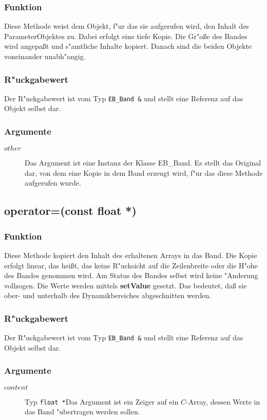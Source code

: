 \documentclass[12pt,a4paper,draft,twoside,onecolumn,titlepage]{book}
\newcommand{\method}[1]{{\bf #1}}
\newcommand{\carg}[1]{$ #1 $}
\newcommand{\ctyp}[1]{{\tt #1}}
\newcommand{\class}[1]{{\sc #1}}
\newcommand{\arglist}[1]{\footnotesize{#1}}
\begin{document}
\subsubsection{Funktion}
Diese Methode weist dem Objekt, f"ur das sie aufgerufen wird, den Inhalt des ParameterObjektes zu. Dabei erfolgt eine tiefe Kopie. Die Gr"o{\ss}e des Bandes wird angepa{\ss}t und s"amtliche Inhalte kopiert. Danach sind die beiden Objekte voneinander unabh"angig.
\subsubsection{R"uckgabewert}
Der R"uckgabewert ist vom Typ \ctyp{EB\_Band \&} und stellt eine Referenz auf das Objekt selbst dar. 
\subsubsection{Argumente}
\begin{description}
\item[\carg{other}]{Das Argument ist eine Instanz der Klasse \class{EB\_Band}. Es stellt das Original dar, von dem eine Kopie in dem Band erzeugt wird, f"ur das diese Methode aufgerufen wurde.}
\end{description}
\subsection{operator=\arglist{(const float *)}}
\subsubsection{Funktion}
Diese Methode kopiert den Inhalt des erhaltenen Arrays in das Band. Die Kopie erfolgt linear, das hei{\ss}t, das keine R"ucksicht auf die Zeilenbreite oder die H"ohe des Bandes genommen wird. Am Status des Bandes selbst wird keine "Anderung vollzogen. Die Werte werden mittels \method{setValue} gesetzt. Das bedeutet, da{\ss} sie ober- und unterhalb des Dynamikbereiches abgeschnitten werden.
\subsubsection{R"uckgabewert}
Der R"uckgabewert ist vom Typ \ctyp{EB\_Band \&} und stellt eine Referenz auf das Objekt selbst dar. 
\subsubsection{Argumente}
\begin{description}
\item[\carg{content}]{Typ \ctyp{float *}Das Argument ist ein Zeiger auf ein $C$-Array, dessen Werte in das Band "ubertragen werden sollen.}
\end{description}
\end{document}
